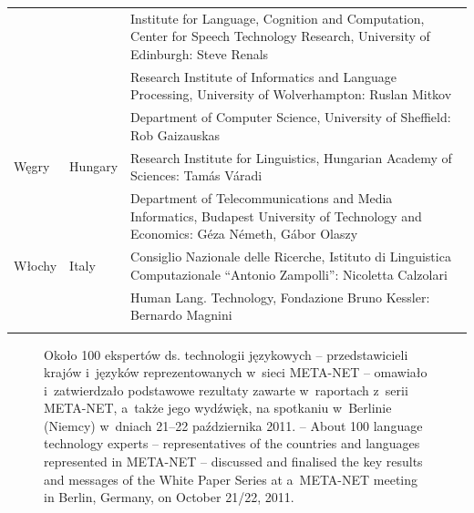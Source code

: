 \begin{longtable}{llp{115mm}}
\addlinespace & & Institute for Language, Cognition and Computation,
Center for Speech Technology Research, University of Edinburgh: Steve
Renals\\
\addlinespace & & Research Institute of Informatics and Language
Processing, University of Wolverhampton: Ruslan Mitkov\\
\addlinespace && Department of Computer Science, University of
Sheffield: Rob Gaizauskas\\
\addlinespace Węgry & \textcolor{grey1}{Hungary} & Research Institute
for Linguistics, Hungarian Academy of Sciences: Tamás Váradi\\
\addlinespace & & Department of Telecommunications and Media
Informatics, Budapest University of Technology and Economics: Géza
Németh, Gábor Olaszy\\
\addlinespace Włochy & \textcolor{grey1}{Italy} & Consiglio Nazionale
delle Ricerche, Istituto di Linguistica Computazionale \newline
“Antonio Zampolli”: Nicoletta Calzolari\\
\addlinespace & & Human Lang. Technology, Fondazione Bruno Kessler:
Bernardo Magnini\\
\addlinespace \end{longtable} \normalsize 

\renewcommand*{\figureformat}{} \renewcommand*{\captionformat}{} 

\begin{figure}[htb]  \center
  \caption{Około 100 ekspertów ds. technologii językowych --
przedstawicieli krajów i~języków reprezentowanych w~sieci META-NET
-- omawiało i~zatwierdzało podstawowe rezultaty zawarte w~raportach
z~serii META-NET, a~także jego wydźwięk, na spotkaniu w~Berlinie
(Niemcy) w~dniach 21--22 października 2011. --
  \textcolor{grey1}{About 100 language technology experts --
representatives of the countries and languages represented in META-NET
-- discussed and finalised the key results and messages of the White
Paper Series at a~META-NET meeting in Berlin, Germany, on October
21/22, 2011.}} \medskip {}
\end{figure} 

\cleardoublepage 

{} \label{whitepaperseries} 

